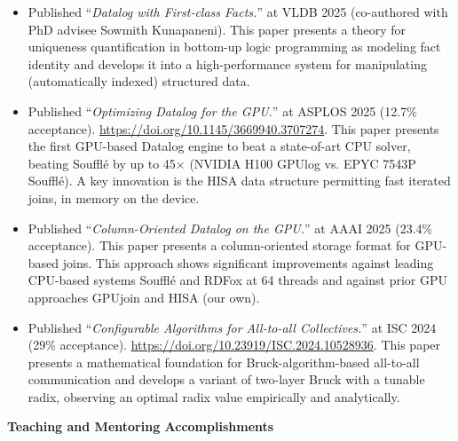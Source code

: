 \documentclass[line]{res}
\begin{document}
\begin{itemize}
\item Published ``\textit{Datalog with First-class Facts.}'' at VLDB 2025 (co-authored with PhD advisee Sowmith Kunapaneni). This paper presents a theory for uniqueness quantification in bottom-up logic programming as modeling fact identity and develops it into a high-performance system for manipulating (automatically indexed) structured data. 
  
\item Published ``\textit{Optimizing Datalog for the GPU.}'' at ASPLOS 2025 (12.7\% acceptance). \url{https://doi.org/10.1145/3669940.3707274}. This paper presents the first GPU-based Datalog engine to beat a state-of-art CPU solver, beating Souffl\'e by up to 45× (NVIDIA H100 GPUlog vs. EPYC 7543P Soufflé). A key innovation is the HISA data structure permitting fast iterated joins, in memory on the device.

\item Published ``\textit{Column-Oriented Datalog on the GPU.}'' at AAAI 2025 (23.4\% acceptance). This paper presents a column-oriented storage format for GPU-based joins. This approach shows significant improvements against leading CPU-based systems Souffl\'e and RDFox at 64 threads and against prior GPU approaches GPUjoin and HISA (our own).

\item Published ``\textit{Configurable Algorithms for All-to-all Collectives.}'' at ISC 2024 (29\% acceptance). \url{https://doi.org/10.23919/ISC.2024.10528936}. This paper presents a mathematical foundation for Bruck-algorithm-based all-to-all communication and develops a variant of two-layer Bruck with a tunable radix, observing an optimal radix value empirically and analytically. 
  
\end{itemize}

\textbf{Teaching and Mentoring Accomplishments}
\end{document}
